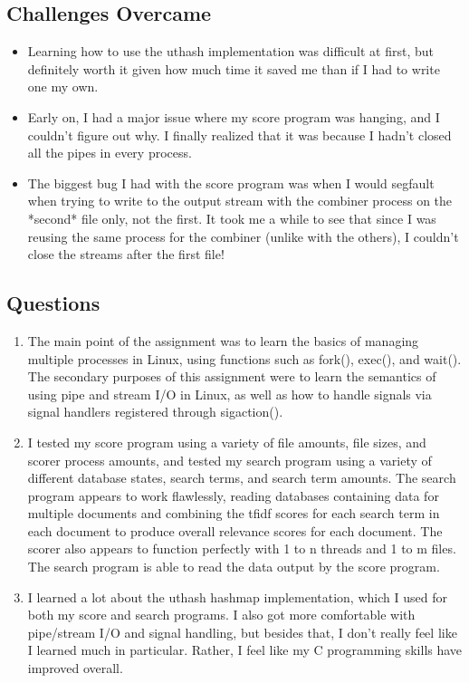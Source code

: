 \documentclass[letterpaper,10pt,fleqn]{article}
\numberwithin{equation}{section}
\begin{document}
\subsection*{Challenges Overcame}
\begin{itemize}
    \item Learning how to use the uthash implementation was difficult at first, but definitely worth it given how much time it saved me than if I had to write one my own.
    \item Early on, I had a major issue where my score program was hanging, and I couldn't figure out why.  I finally realized that it was because I hadn't closed all the pipes in every process.
    \item The biggest bug I had with the score program was when I would segfault when trying to write to the output stream with the combiner process on the *second* file only, not the first.  It took me a while to see that since I was reusing the same process for the combiner (unlike with the others), I couldn't close the streams after the first file!
\end{itemize}

\subsection*{Questions}
\begin{enumerate}
    \item The main point of the assignment was to learn the basics of managing multiple processes in Linux, using functions such as fork(), exec(), and wait().  The secondary purposes of this assignment were to learn the semantics of using pipe and stream I/O in Linux, as well as how to handle signals via signal handlers registered through sigaction().
    \item I tested my score program using a variety of file amounts, file sizes, and scorer process amounts, and tested my search program using a variety of different database states, search terms, and search term amounts.  The search program appears to work flawlessly, reading databases containing data for multiple documents and combining the tfidf scores for each search term in each document to produce overall relevance scores for each document.  The scorer also appears to function perfectly with 1 to n threads and 1 to m files.  The search program is able to read the data output by the score program.
    \item I learned a lot about the uthash hashmap implementation, which I used for both my score and search programs.  I also got more comfortable with pipe/stream I/O and signal handling, but besides that, I don't really feel like I learned much in particular.  Rather, I feel like my C programming skills have improved overall.
\end{enumerate}
\end{document}
